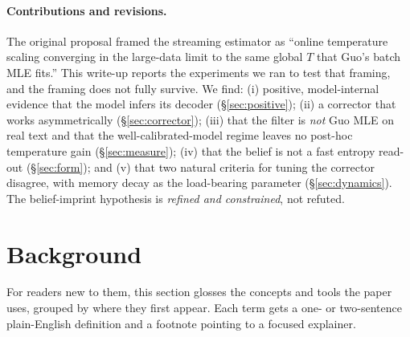 \documentclass[11pt]{article}
\begin{document}
\paragraph{Contributions and revisions.}
The original proposal framed the streaming estimator as ``online temperature
scaling converging in the large-data limit to the same global $T$ that Guo's
batch MLE fits.'' This write-up reports the experiments we ran to test that
framing, and the framing does not fully survive. We find: (i) positive,
model-internal evidence that the model infers its decoder
(\S\ref{sec:positive}); (ii) a corrector that works asymmetrically
(\S\ref{sec:corrector}); (iii) that the filter is \emph{not} Guo MLE on real
text and that the well-calibrated-model regime leaves no post-hoc temperature
gain (\S\ref{sec:measure}); (iv) that the belief is not a fast entropy read-out
(\S\ref{sec:form}); and (v) that two natural criteria for tuning the corrector
disagree, with memory decay as the load-bearing parameter (\S\ref{sec:dynamics}).
The belief-imprint hypothesis is \emph{refined and constrained}, not refuted.

\section{Background}\label{sec:background}
For readers new to them, this section glosses the concepts and tools the paper
uses, grouped by where they first appear. Each term gets a one- or two-sentence
plain-English definition and a footnote pointing to a focused explainer.
\end{document}
